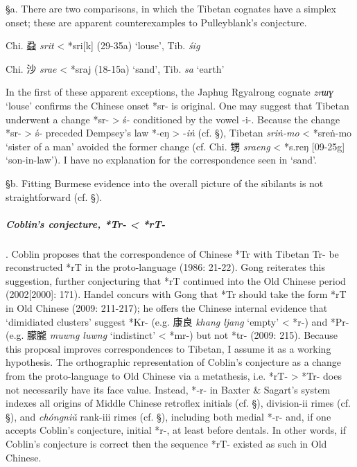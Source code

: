 §a. There are two comparisons, in which the Tibetan cognates have a
simplex onset; these are apparent counterexamples to Pulleyblank's
conjecture.

\begin{description} \item
Chi. 蝨  \emph{srit} \textless{} *sri{[}k] (29-35a) `louse', Tib. {} \emph{śig}
\item Chi. 沙  \emph{srae} \textless{} *s{}raj (18-15a) `sand', Tib. {} \emph{sa} `earth'
\end{description}

In the first of these apparent exceptions, the Japhug Rgyalrong cognate
 \emph{zrɯɣ} `louse' confirms the Chinese onset *sr- is original. One may
suggest that Tibetan underwent a change *sr- \textgreater{} ś-
conditioned by the vowel -i-. Because the change *sr- \textgreater{} ś-
preceded Dempsey's law *-eŋ \textgreater{} -\emph{iṅ} (cf. §), Tibetan {} \emph{sriṅ-mo} \textless{} *sreṅ-mo `sister of a man' avoided
the former change (cf. Chi. 甥 \emph{sraeng} \textless{} *s.reŋ
{[}09-25g] `son-in-law'). I have no explanation for the correspondence
seen in `sand'.

§b. Fitting Burmese evidence into the overall picture of the sibilants
is not straightforward (cf. §).

\subparagraph{Coblin's conjecture, *Tr- \textless{} *rT-}. Coblin
proposes that the correspondence of Chinese *Tr with Tibetan Tr- be
reconstructed *rT in the proto-language (1986: 21-22). Gong reiterates
this suggestion, further conjecturing that *rT continued into the Old
Chinese period (2002{[}2000]: 171). Handel concurs with Gong that *Tr
should take the form *rT in Old Chinese (2009: 211-217); he offers the
Chinese internal evidence that `dimidiated clusters' suggest *Kr- (e.g.
康良 \emph{khang ljang} `empty' \textless{} *{}r-) and *Pr- (e.g. 朦朧
 \emph{muwng luwng} `indistinct' \textless{} *mr{}-) but not *tr- (2009:
215). Because this proposal improves cor­re­spon­dences to Tibetan, I
assume it as a working hypothesis. The orthographic representation of
Coblin's conjecture as a change from the proto-language to Old Chinese
via a metathesis, i.e. *rT- \textgreater{} *Tr- does not necessarily
have its face value. Instead, *‑r- in Baxter \& Sagart's system indexes
all origins of Middle Chinese retroflex initials (cf. §), division-ii
rimes (cf. §), and \emph{chóngniǔ} rank-iii rimes (cf. §), including
both medial *-r- and, if one accepts Coblin's conjecture, initial *r-,
at least before dentals. In other words, if Coblin's conjecture is
correct then the sequence *rT- existed as such in Old Chinese.

